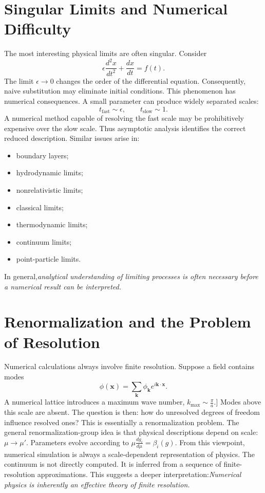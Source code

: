 \section{Singular Limits and Numerical Difficulty}
\label{nm:sl}

The most interesting physical limits are often singular.
Consider
\[\epsilon\frac{d^2x}{dt^2}+\frac{dx}{dt}=f(t).\]
The limit $\epsilon\rightarrow 0$
changes the order of the differential equation.
Consequently, naive substitution may eliminate initial conditions.
This phenomenon has numerical consequences. A small parameter can produce 
widely separated scales:
\[t_{\mathrm{fast}}\sim\epsilon,\qquad t_{\mathrm{slow}}\sim 1.\]
A numerical method capable of resolving the fast scale may be prohibitively 
expensive over the slow scale.
Thus asymptotic analysis identifies the correct reduced description.
Similar issues arise in:
\begin{itemize}
\item boundary layers;
\item hydrodynamic limits;
\item nonrelativistic limits;
\item classical limits;
\item thermodynamic limits;
\item continuum limits;
\item point-particle limits.
\end{itemize}
In general,\emph{analytical understanding of limiting processes is often 
necessary before a numerical result can be interpreted.}

\section{ Renormalization and the Problem of Resolution}
\label{nm:rn}

Numerical calculations always involve finite resolution.
Suppose a field contains modes
\[\phi(\mathbf{x})=\sum_{\mathbf{k}}\phi_{\mathbf{k}}e^{i\mathbf{k}\cdot\mathbf{x}}.\]
A numerical lattice introduces a maximum wave number,
$k_{\max}\sim\frac{\pi}{a}$.]
Modes above this scale are absent.
The question is then: how do unresolved degrees of freedom influence resolved ones?
This is essentially a renormalization problem.
The general renormalization-group idea is that physical descriptions depend on scale:
$\mu\rightarrow\mu'$.
Parameters evolve according to
$\mu\frac{dg_i}{d\mu}=\beta_i(g)$.
From this viewpoint, numerical simulation is always a scale-dependent 
representation of physics. The continuum is not directly computed. It is 
inferred from a sequence of finite-resolution approximations.
This suggests a deeper interpretation:\emph{Numerical physics is 
inherently an effective theory of finite resolution.}

